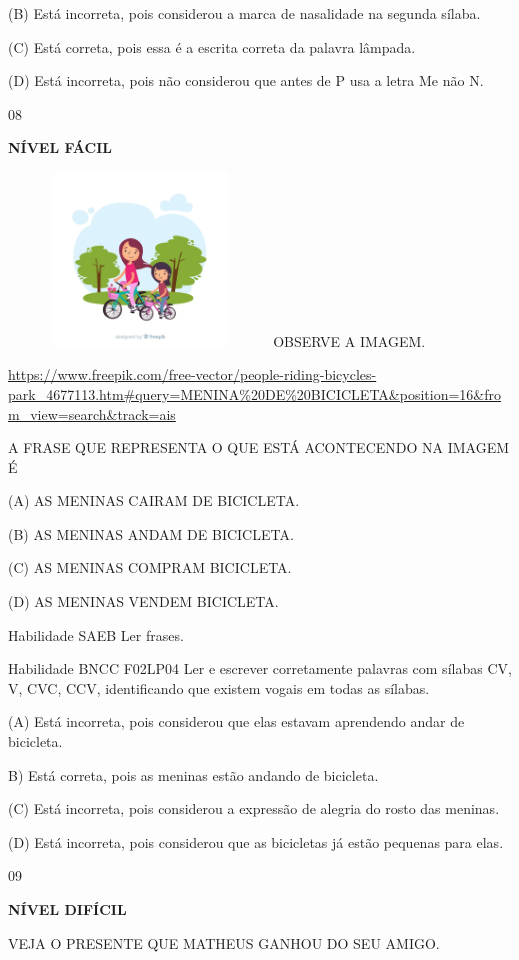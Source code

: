 {{(B) Está incorreta, pois considerou a marca de nasalidade na segunda
sílaba.

(C) Está correta, pois essa é a escrita correta da palavra lâmpada.

(D) Está incorreta, pois não considerou que antes de P usa a letra Me
não N.

\num{08}

\textbf{NÍVEL FÁCIL}

\includegraphics[width=2.76266in,height=1.82051in]{media/image179.png}OBSERVE
A IMAGEM.

\url{https://www.freepik.com/free-vector/people-riding-bicycles-park_4677113.htm\#query=MENINA\%20DE\%20BICICLETA\&position=16\&from_view=search\&track=ais}

A FRASE QUE REPRESENTA O QUE ESTÁ ACONTECENDO NA IMAGEM É

(A) AS MENINAS CAIRAM DE BICICLETA.

(B) AS MENINAS ANDAM DE BICICLETA.

(C) AS MENINAS COMPRAM BICICLETA.

(D\protect\hypertarget{_Hlk129513580}{}{}) AS MENINAS VENDEM BICICLETA.

Habilidade SAEB Ler frases.

Habilidade BNCC F02LP04 Ler e escrever corretamente palavras com sílabas
CV, V, CVC, CCV, identificando que existem vogais em todas as sílabas.

(A) Está incorreta, pois considerou que elas estavam aprendendo andar de
bicicleta.

B) Está correta, pois as meninas estão andando de bicicleta.

(C) Está incorreta, pois considerou a expressão de alegria do rosto das
meninas.

(D) Está incorreta, pois considerou que as bicicletas já estão pequenas
para elas.

\num{09}

\textbf{NÍVEL DIFÍCIL}

VEJA O PRESENTE QUE MATHEUS GANHOU DO SEU AMIGO.

}}
